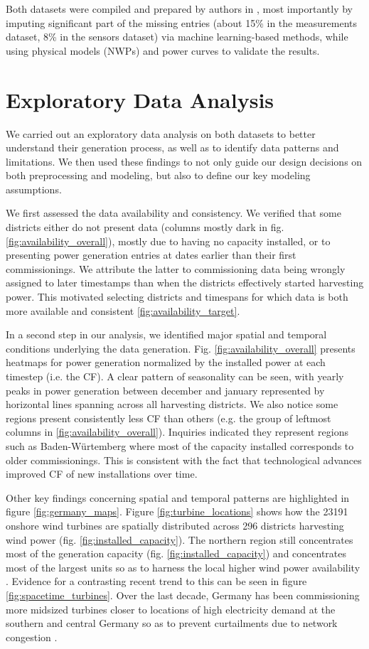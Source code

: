 Both datasets were compiled and prepared by authors in \cite{becker2017completion}, most importantly by imputing significant part of the missing entries (about 15\% in the measurements dataset, 8\% in the sensors dataset) via machine learning-based methods, while using physical models (NWPs) and power curves to validate the results.

\section{Exploratory Data Analysis}\label{sec:eda}
We carried out an exploratory data analysis on both datasets to better understand their generation process, as well as to identify data patterns and limitations.
We then used these findings to not only guide our design decisions on both preprocessing and modeling, but also to define our key modeling assumptions.

We first assessed the data availability and consistency.
We verified that some districts either do not present data (columns mostly dark in fig. \ref{fig:availability_overall}), mostly due to having no capacity installed, or to presenting power generation entries at dates earlier than their first commissionings.
We attribute the latter to commissioning data being wrongly assigned to later timestamps than when the districts effectively started harvesting power.
This motivated selecting districts and timespans for which data is both more available and consistent \ref{fig:availability_target}.

In a second step in our analysis, we identified major spatial and temporal conditions underlying the data generation.
Fig. \ref{fig:availability_overall} presents heatmaps for power generation normalized by the installed power at each timestep (i.e. the CF).
A clear pattern of seasonality can be seen, with yearly peaks in power generation between december and january represented by horizontal lines spanning across all harvesting districts.
We also notice some regions present consistently less CF than others (e.g. the group of leftmost columns in \ref{fig:availability_overall}).
Inquiries indicated they represent regions such as Baden-Würtemberg where most of the capacity installed corresponds to older commissionings.
This is consistent with the fact that technological advances improved CF of new installations over time.

Other key findings concerning spatial and temporal patterns are highlighted in figure \ref{fig:germany_maps}.
Figure \ref{fig:turbine_locations} shows how the 23191 onshore wind turbines are spatially distributed across 296 districts harvesting wind power (fig. \ref{fig:installed_capacity}).
The northern region still concentrates most of the generation capacity (fig. \ref{fig:installed_capacity}) and concentrates most of the largest units so as to harness the local higher wind power availability \cite{windatlas}.
Evidence for a contrasting recent trend to this can be seen in figure \ref{fig:spacetime_turbines}.
Over the last decade, Germany has been commissioning more midsized turbines closer to locations of high electricity demand at the southern and central Germany so as to prevent curtailments due to network congestion \cite{engeland2017variability}.

